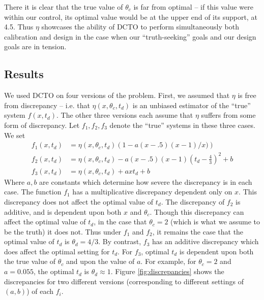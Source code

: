 \documentclass[12pt]{article}
\begin{document}
%
There it is clear that the true value of $\theta_c$ is far from optimal -- if this value were within our control, its optimal value would be at the upper end of its support, at 4.5.
%
Thus $\eta$ showcases the ability of DCTO to perform simultaneously both calibration and design in the case when our ``truth-seeking'' goals and our design goals are in tension.
%

%
\subsection{Results}
% 
We used DCTO on four versions of the problem.
%
First, we assumed that $\eta$ is free from discrepancy -- i.e. that $\eta(x,\theta_c,t_d)$ is an unbiased estimator of the ``true'' system $f(x,t_d)$.
%
The other three versions each assume that $\eta$ suffers from some form of discrepancy.
%
Let $f_1,f_2,f_3$ denote the ``true'' systems in these three cases.
%
We set 
\begin{align*}
f_1(x,t_d) &= \eta(x,\theta_c,t_d) \left(1-a(x-.5)(x-1)/x) \right) \\
f_2(x,t_d)&= \eta(x,\theta_c,t_d) - a(x-.5)(x-1)\left(t_d-\frac43\right)^2 + b\\
f_3(x,t_d)&=\eta(x,\theta_c,t_d) + axt_d+b
\end{align*}
%
Where $a,b$ are constants which determine how severe the discrepancy is in each case.
%
The function $f_1$ has a multiplicative discrepancy dependent only on $x$. 
%
This discrepancy does not affect the optimal value of $t_d$.  
%
The discrepancy of $f_2$ is additive, and is dependent upon both $x$ and $\theta_c$. 
%
Though this discrepancy can affect the optimal value of $t_d$, in the case that $\theta_c=2$ (which is what we assume to be the truth) it does not.
%
Thus under $f_1$ and $f_2$, it remains the case that the optimal value of $t_d$ is $\theta_d=4/3$. 
%
By contrast, $f_3$ has an additive discrepancy which does affect the optimal setting for $t_d$. 
%
For $f_3$, optimal $t_d$ is dependent upon both the true value of $\theta_c$ and upon the value of $a$. 
%
For example, for $\theta_c=2$ and $a=0.055$, the optimal $t_d$ is $\theta_d\approx1$.
%
Figure \ref{fig:discrepancies} shows the discrepancies for two different versions (corresponding to different settings of $(a,b)$) of each $f_i$.
%
\end{document}
